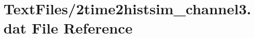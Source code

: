 \hypertarget{2time2histsim__channel3_8dat}{}\section{Text\+Files/2time2histsim\+\_\+channel3.dat File Reference}
\label{2time2histsim__channel3_8dat}
